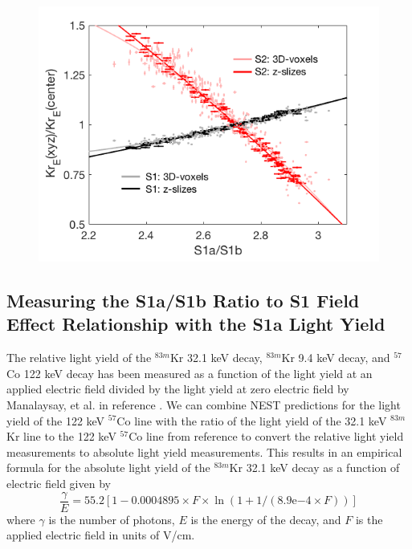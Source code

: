 \begin{figure}
\includegraphics[scale=0.4]{figures/Fig5.png}
 \label{fig:S1FieldFig}
\end{figure}

\subsection{Measuring the S1a/S1b Ratio to S1 Field Effect Relationship with the S1a Light Yield} \label{MatthewsIdea}

The relative light yield of the $^{83m}$Kr 32.1 keV decay, $^{83m}$Kr 9.4 keV decay, and $^{57}$Co 122 keV decay has been measured as a function of the light yield at an applied electric field divided by the light yield at zero electric field by Manalaysay, et al. in reference \cite{Manalaysay}.  We can combine NEST predictions for the light yield of the 122 keV $^{57}$Co line with the ratio of the light yield of the 32.1 keV $^{83m}$Kr line to the 122 keV $^{57}$Co line from reference \cite{Manalaysay} to convert the relative light yield measurements to absolute light yield measurements.  This results in an empirical formula for the absolute light yield of the $^{83m}$Kr 32.1 keV decay as a function of electric field given by
\begin{equation}
\frac{\gamma}{E} = 55.2[1-0.0004895 \times F \times \ln{(1 + 1/(8.9\mathrm{e}{-4} \times F))}]
\label{S1aYield}
\end{equation}
where $\gamma$ is the number of photons, $E$ is the energy of the decay, and $F$ is the applied electric field in units of V/cm.  

